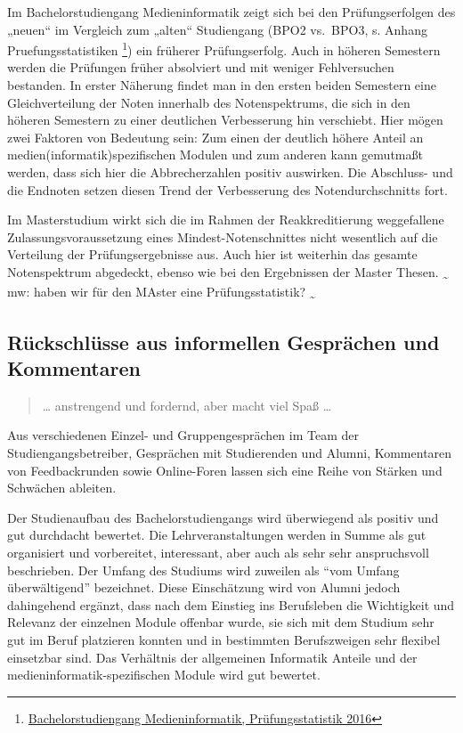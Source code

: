 Im Bachelorstudiengang Medieninformatik zeigt sich bei den
Prüfungserfolgen des „neuen`` im Vergleich zum „alten`` Studiengang
(BPO2 vs.~BPO3, s. Anhang Pruefungsstatistiken \footnote{\href{../anhaenge/pruefungsstatistiken.pdf}{Bachelorstudiengang
  Medieninformatik, Prüfungsstatistik 2016}}) ein früherer
Prüfungserfolg. Auch in höheren Semestern werden die Prüfungen früher
absolviert und mit weniger Fehlversuchen bestanden. In erster Näherung
findet man in den ersten beiden Semestern eine Gleichverteilung der
Noten innerhalb des Notenspektrums, die sich in den höheren Semestern zu
einer deutlichen Verbesserung hin verschiebt. Hier mögen zwei Faktoren
von Bedeutung sein: Zum einen der deutlich höhere Anteil an
medien(informatik)spezifischen Modulen und zum anderen kann gemutmaßt
werden, dass sich hier die Abbrecherzahlen positiv auswirken. Die
Abschluss- und die Endnoten setzen diesen Trend der Verbesserung des
Notendurchschnitts fort.

Im Masterstudium wirkt sich die im Rahmen der Reakkreditierung
weggefallene Zulassungsvoraussetzung eines Mindest-Notenschnittes nicht
wesentlich auf die Verteilung der Prüfungsergebnisse aus. Auch hier ist
weiterhin das gesamte Notenspektrum abgedeckt, ebenso wie bei den
Ergebnissen der Master Thesen. \textsubscript{\textasciitilde{}} mw:
haben wir für den MAster eine Prüfungsstatistik?
\textsubscript{\textasciitilde{}}

\subsection{Rückschlüsse aus informellen Gesprächen und
Kommentaren}\label{ruxfcckschluxfcsse-aus-informellen-gespruxe4chen-und-kommentaren}

\begin{quote}
\ldots{} anstrengend und fordernd, aber macht viel Spaß \ldots{}
\end{quote}

Aus verschiedenen Einzel- und Gruppengesprächen im Team der
Studiengangsbetreiber, Gesprächen mit Studierenden und Alumni,
Kommentaren von Feedbackrunden sowie Online-Foren lassen sich eine Reihe
von Stärken und Schwächen ableiten.

Der Studienaufbau des Bachelorstudiengangs wird überwiegend als positiv
und gut durchdacht bewertet. Die Lehrveranstaltungen werden in Summe als
gut organisiert und vorbereitet, interessant, aber auch als sehr sehr
anspruchsvoll beschrieben. Der Umfang des Studiums wird zuweilen als
``vom Umfang überwältigend'' bezeichnet. Diese Einschätzung wird von
Alumni jedoch dahingehend ergänzt, dass nach dem Einstieg ins
Berufsleben die Wichtigkeit und Relevanz der einzelnen Module offenbar
wurde, sie sich mit dem Studium sehr gut im Beruf platzieren konnten und
in bestimmten Berufszweigen sehr flexibel einsetzbar sind. Das
Verhältnis der allgemeinen Informatik Anteile und der
medieninformatik-spezifischen Module wird gut bewertet.


